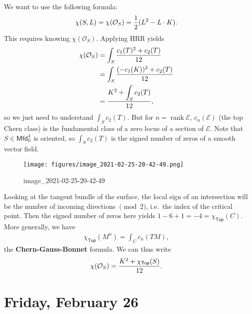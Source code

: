 \begin{remark}

We want to use the following formula:
\begin{align*}
\chi(S, L) = \chi({\mathcal{O}}_S) = {1\over 2}(L^2 - L\cdot K)
.\end{align*}
This requires knowing \(\chi({\mathcal{O}}_S)\). Applying HRR yields
\begin{align*}
\chi({\mathcal{O}}_S) 
&= \int_S {c_1(T)^2 + c_2(T) \over 12}\\
&= \int_S { (-c_1(K))^2 + c_2(T) \over 12}\\
&= {K^2 + \displaystyle\int_S c_2(T) \over 12}
,\end{align*}
so we just need to understand \(\int_S c_2(T)\). But for
\(n=\operatorname{rank}\mathcal{E}\), \(c_n( \mathcal{E} )\) (the top
Chern class) is the fundamental class of a zero locus of a section of
\(\mathcal{E}\). Note that \(S \in {\mathsf{Mfd}}_{\mathbb{R}}^4\) is
oriented, so \(\int_S c_2(T)\) is the signed number of zeros of a smooth
vector field.

\begin{figure}
\centering
\texttt{[image: figures/image\_2021-02-25-20-42-49.png]}
\caption{image\_2021-02-25-20-42-49}
\end{figure}

Looking at the tangent bundle of the surface, the local sign of an
intersection will be the number of incoming directions \(\pmod 2\),
i.e.~the index of the critical point. Then the signed number of zeros
here yields \(1-6+1 = -4 = \chi_{{\mathsf{Top}}}(C)\). More generally,
we have
\begin{align*}
\chi_{{\mathsf{Top}}}(M^n) = \int_C c_{n}(TM)
,\end{align*}
the \textbf{Chern-Gauss-Bonnet} formula. We can thus write
\begin{align*}
\chi({\mathcal{O}}_S) = {K^2 + \chi_{\mathsf{Top}}(S) \over 12 }
.\end{align*}

\end{remark}

\hypertarget{friday-february-26}{%
\section{Friday, February 26}\label{friday-february-26}}

